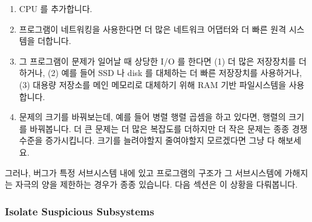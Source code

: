 \begin{enumerate}
\item	CPU 를 추가합니다.
\item	프로그램이 네트워킹을 사용한다면 더 많은 네트워크 어댑터와 더 빠른 원격
	시스템을 더합니다.
\item	그 프로그램이 문제가 일어날 때 상당한 I/O 를 한다면 (1) 더 많은
	저장장치를 더하거나, (2) 예를 들어 SSD 나 disk 를 대체하는 더 빠른
	저장장치를 사용하거나, (3) 대용량 저장소를 메인 메모리로 대체하기 위해
	RAM 기반 파일시스템을 사용합니다.
\item	문제의 크기를 바꿔보는데, 예를 들어 병렬 행렬 곱셈을 하고 있다면,
	행렬의 크기를 바꿔봅니다.
	더 큰 문제는 더 많은 복잡도를 더하지만 더 작은 문제는 종종 경쟁 수준을
	증가시킵니다.
	크기를 늘려야할지 줄여야할지 모르겠다면 그냥 다 해보세요.

\end{enumerate}

그러나, 버그가 특정 서브시스템 내에 있고 프로그램의 구조가 그 서브시스템에
가해지는 자극의 양을 제한하는 경우가 종종 있습니다.
다음 섹션은 이 상황을 다뤄봅니다.

\subsubsection{Isolate Suspicious Subsystems}
\label{sec:debugging:Isolate Suspicious Subsystems}

